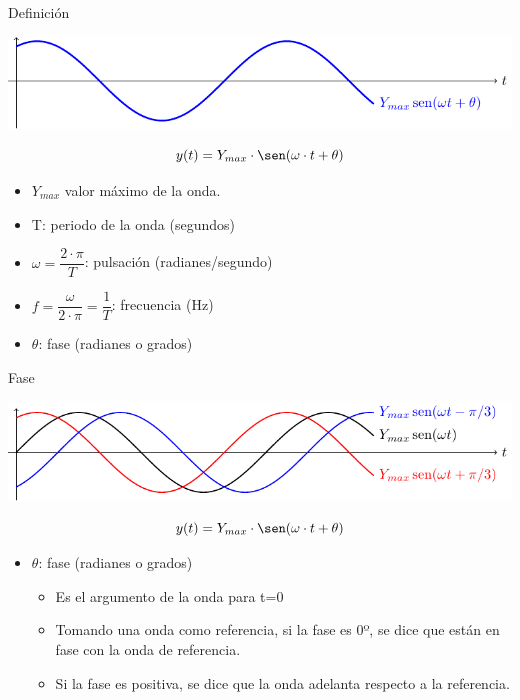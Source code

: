 \documentclass[aspectratio=169, usenames,svgnames,dvipsnames]{beamer}
\begin{document}
\begin{frame}[label={sec:orgca5ca8e}]{Definición}
\begin{center}
\includegraphics[width=.9\linewidth]{../figs/sin.pdf}
\end{center}


\[
y(t)=Y_{max}\cdot\sen(\omega\cdot t+\theta)
\]

\begin{itemize}
\item \(Y_{max}\) valor máximo de la onda.

\item T: periodo de la onda (segundos)

\item \(\omega=\dfrac{2\cdot\pi}{T}\): pulsación (radianes/segundo)

\item \(f=\dfrac{\omega}{2\cdot\pi}=\dfrac{1}{T}\): frecuencia (Hz)

\item \(\theta\): fase (radianes o grados)
\end{itemize}
\end{frame}
\begin{frame}[label={sec:org8f81b6a}]{Fase}
\begin{center}
\includegraphics[width=.9\linewidth]{../figs/desfase.pdf}
\end{center}


\[
y(t)=Y_{max}\cdot\sen(\omega\cdot t+\theta)
\]

\begin{itemize}
\item \(\theta\): fase (radianes o grados)

\begin{itemize}
\item Es el argumento de la onda para t=0

\item Tomando una onda como referencia, si la fase es 0º, se dice que
están en fase con la onda de referencia.

\item Si la fase es positiva, se dice que la onda adelanta
respecto a la referencia.
\end{itemize}
\end{itemize}
\end{frame}
\end{document}
